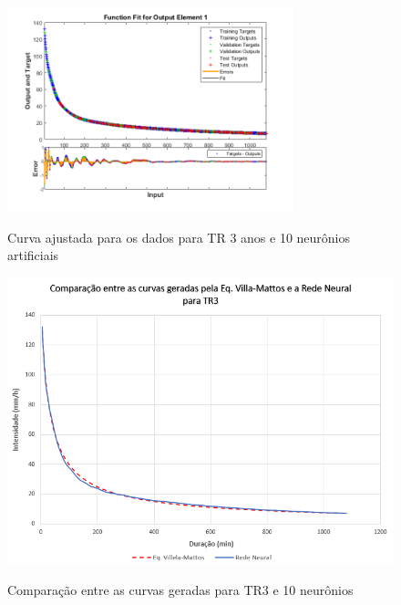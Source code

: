 \begin{figure}[H]
    \caption{Curva ajustada para os dados para TR 3 anos e 10 neurônios artificiais}
    \centering
    \includegraphics[width=0.74\textwidth]{Textuais/Figuras/NN/tr3-10neuronio.png}
    \label{fig:tr3-10n}
\end{figure}

\begin{figure}[H]
    \caption{Comparação entre as curvas geradas para TR3 e 10 neurônios}
    \centering
    \includegraphics[width=\textwidth]{Textuais/Resultados/Comparacao/TR3.png}
    \label{fig:comp-tr3}
\end{figure}